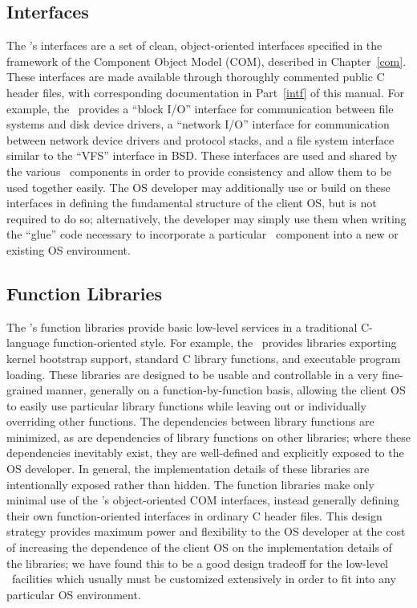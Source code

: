 \subsection{Interfaces}

The \oskit's interfaces are a set of
clean, object-oriented interfaces
specified in the framework of the Component Object Model (COM),
described in Chapter~\ref{com}.
These interfaces are made available
through thoroughly commented public C header files,
with corresponding documentation in Part~\ref{intf} of this manual.
For example, the \oskit\ provides a ``block I/O'' interface
for communication between file systems and disk device drivers,
a ``network I/O'' interface
for communication between network device drivers and protocol stacks,
and a file system interface similar to the ``VFS'' interface in BSD\@.
These interfaces are used and shared by the various \oskit\ components
in order to provide consistency
and allow them to be used together easily.
The OS developer may additionally use or build on these interfaces
in defining the fundamental structure of the client OS,
but is not required to do so;
alternatively, the developer may simply use them
when writing the ``glue'' code necessary
to incorporate a particular \oskit\ component
into a new or existing OS environment.

\subsection{Function Libraries}

The \oskit's function libraries
provide basic low-level services
in a traditional C-language function-oriented style.
For example,
the \oskit\ provides libraries
exporting kernel bootstrap support,
standard C library functions,
and executable program loading.
These libraries are designed
to be usable and controllable in a very fine-grained manner,
generally on a function-by-function basis,
allowing the client OS to easily use particular library functions
while leaving out or individually overriding other functions.
The dependencies between library functions are minimized,
as are dependencies of library functions on other libraries;
where these dependencies inevitably exist,
they are well-defined and explicitly exposed to the OS developer.
In general, the implementation details of these libraries
are intentionally exposed rather than hidden.
The function libraries make only minimal use
of the \oskit's object-oriented COM interfaces,
instead generally defining their own function-oriented interfaces
in ordinary C header files.
This design strategy provides
maximum power and flexibility to the OS developer
at the cost of increasing the dependence of the client OS
on the implementation details of the libraries;
we have found this to be a good design tradeoff
for the low-level \oskit\ facilities
which usually must be customized extensively
in order to fit into any particular OS environment.

